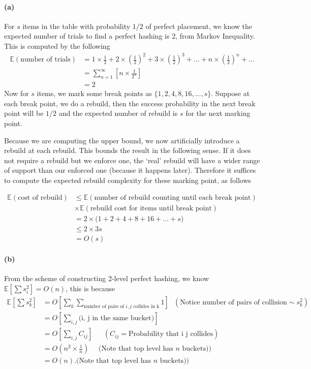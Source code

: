 \documentclass[12pt]{article}
\begin{document}
\paragraph{(a)}
For $s$ items in the table with probability $1/2$ of perfect placement, we know the expected number of trials to find a perfect hashing is 2, from Markov Inequality. This is computed by the following 
\begin{align*}
\mathbb{E} (\text{number of trials}) &= 1 \times \frac{1}{2} + 2 \times (\frac{1}{2})^2 + 3 \times (\frac{1}{2})^3 + ... + n\times(\frac{1}{2})^n + ... \\
& = \sum_{n=1}^{\infty}\left[n\times\frac{1}{2^n}\right]\\
& = 2
\end{align*} 
Now for $s$ items, we mark some break points as $\{1, 2, 4, 8, 16, ..., s\}$. Suppose at each break point, we do a rebuild, then the success probability in the next break point will be $1/2$ and the expected number of rebuild is $s$ for the next marking point. 

Because we are computing the upper bound, we now artificially introduce a rebuild at each rebuild. This bounds the result in the following sense. If it does not require a rebuild but we enforce one, the `real' rebuild will have a wider range of support than our enforced one (because it happens later). Therefore it suffices to compute the expected rebuild complexity for these marking point, as follows

\begin{align*}
\mathbb{E} (\text{cost of rebuild}) &\leq \mathbb{E} (\text{number of rebuild counting until each break point}) \\
& \times \mathbb{E}(\text{rebuild cost for items until break point}) \\
& = 2 \times \big(1 + 2 + 4 + 8 + 16 + ... + s\big)\\
& \leq 2 \times 3s \\
& = O(s) 
\end{align*} 

\paragraph{(b)}
From the scheme of constructing 2-level perfect hashing, we know $\mathbb{E}\left[\sum s_i^2\right] = O(n)$, this is because 
\begin{align*}
\mathbb{E}\left[\sum s_k^2\right] & = O\left[\sum_k \sum_{\text{number of pairs of } i, j \text{ collides in k}} 1\right] \:\:\:  (\text{Notice number of pairs of collision} \sim s_k^2)\\
& = O\left[\sum_{i,j} \text{(i, j in the same bucket)}\right]\\
& = O\left[\sum_{i,j}C_{ij}\right] \:\:\:\:\:\:\:  (C_{ij} = \text{Probability that i j collides})\\
&= O(n^2\times\frac{1}{n}) \:\:\:\:\:\: \text{(Note that top level has $n$ buckets)})\\ 
& = O(n).\text{(Note that top level has $n$ buckets)})
\end{align*}
\end{document}
